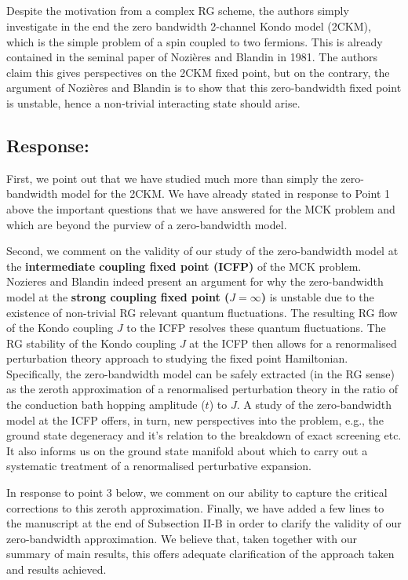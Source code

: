 \documentclass{article}
\newcommand{\response}[1]{{\color{blue}\subsection*{Response:}{#1}}}
\newcommand{\point}[1]{\subsection{}{#1}}
\begin{document}
\point{Despite the motivation from a complex RG scheme, the authors simply investigate in the end the zero bandwidth 2-channel Kondo model (2CKM),  which is the simple problem of a spin coupled to two fermions. This is already contained in the seminal paper of Nozières and Blandin in 1981. The authors claim this gives perspectives on the 2CKM fixed point, but on the contrary, the argument of Nozières and Blandin is to show that this zero-bandwidth fixed point is unstable, hence a non-trivial interacting state should arise.
}

\response{First, we point out that we have studied much more than simply the zero-bandwidth model for the 2CKM. We have already stated in response to  Point 1 above the important questions that we have answered for the MCK problem and which are beyond the purview of a zero-bandwidth model.\\
\par\noindent
Second, we comment on the validity of our study of the zero-bandwidth  model at the \textbf{intermediate coupling fixed point (ICFP)} of the MCK  problem. Nozieres and Blandin indeed present an argument for why the  zero-bandwidth model at the \textbf{strong coupling fixed point ($J=\infty$)}  is unstable due to the existence of non-trivial RG relevant quantum  fluctuations. The resulting RG flow of the Kondo coupling $J$ to  the ICFP resolves these quantum fluctuations. The RG stability of the  Kondo coupling $J$ at the ICFP then allows for a renormalised perturbation  theory approach to studying the fixed point Hamiltonian. Specifically, the  zero-bandwidth model can be safely extracted (in the RG sense) as the zeroth  approximation of a renormalised perturbation theory in the ratio of  the conduction bath hopping amplitude ($t$) to $J$. A study of the zero-bandwidth model at the ICFP offers, in turn, new perspectives  into the problem, e.g., the ground state degeneracy and it's relation  to the breakdown of exact screening etc. It also informs us on the ground state manifold about which to carry out a systematic treatment of a renormalised perturbative expansion.\\
\par\noindent
In response to point 3 below, we  comment on our ability to capture the critical corrections to this zeroth  approximation. Finally, we have added a few lines to the manuscript at the end of  Subsection II-B in order to clarify the validity of our zero-bandwidth approximation. We believe that, taken together with our summary of main results, this offers adequate clarification of the approach taken and results achieved. 
}
\end{document}
